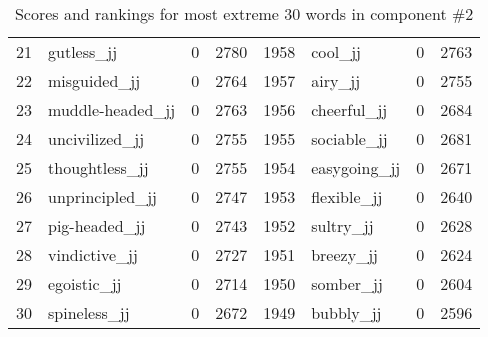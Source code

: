 \begin{table}[tbp]
\begin{tabular}{| rlr@{.}l | rlr@{.}l |}
    21 & gutless\_jj & 0 & 2780    &    1958 & cool\_jj & 0 & 2763 \\
    22 & misguided\_jj & 0 & 2764    &    1957 & airy\_jj & 0 & 2755 \\
    23 & muddle-headed\_jj & 0 & 2763    &    1956 & cheerful\_jj & 0 & 2684 \\
    24 & uncivilized\_jj & 0 & 2755    &    1955 & sociable\_jj & 0 & 2681 \\
    25 & thoughtless\_jj & 0 & 2755    &    1954 & easygoing\_jj & 0 & 2671 \\
    26 & unprincipled\_jj & 0 & 2747    &    1953 & flexible\_jj & 0 & 2640 \\
    27 & pig-headed\_jj & 0 & 2743    &    1952 & sultry\_jj & 0 & 2628 \\
    28 & vindictive\_jj & 0 & 2727    &    1951 & breezy\_jj & 0 & 2624 \\
    29 & egoistic\_jj & 0 & 2714    &    1950 & somber\_jj & 0 & 2604 \\
    30 & spineless\_jj & 0 & 2672    &    1949 & bubbly\_jj & 0 & 2596 \\
    \hline
    \end{tabular}
    \caption{Scores and rankings for most extreme 30 words in component \#2} 
\end{table}
\clearpage
